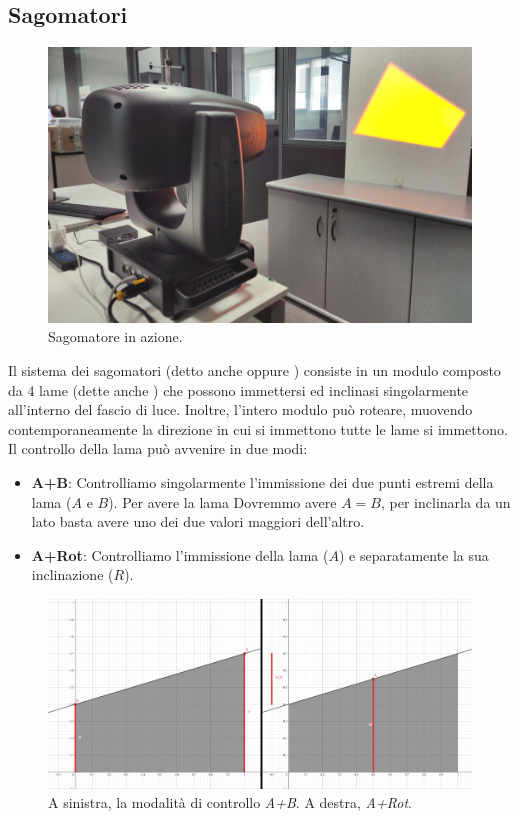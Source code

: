 \documentclass[main.tex]{subfiles}
\begin{document}
\subsection{Sagomatori}\label{subsec:5_shaper}
\begin{figure}[H]
    \centering
    \includegraphics[width=.8\linewidth]{img/newFeatures/shaper.jpg}
    \caption{Sagomatore in azione.}
    \label{fig:5_shaper}
\end{figure}
Il sistema dei sagomatori (detto anche  oppure ) consiste in un modulo composto da 4 lame (dette anche ) che possono immettersi ed inclinasi singolarmente all'interno del fascio di luce. Inoltre, l'intero modulo può roteare, muovendo contemporaneamente la direzione in cui si immettono tutte le lame si immettono. \newline
\clearpage %
Il controllo della lama può avvenire in due modi:
\begin{itemize}
	\item \textbf{A+B}: Controlliamo singolarmente l'immissione dei due punti estremi della lama ($A$ e $B$). Per avere la lama  Dovremmo avere $A = B$, per inclinarla da un lato basta avere uno dei due valori maggiori dell'altro.
	\item \textbf{A+Rot}: Controlliamo l'immissione della lama ($A$) e separatamente la sua inclinazione ($R$).
\end{itemize}
\begin{figure}[H]
    \centering
    \includegraphics[width=1\linewidth]{img/newFeatures/abVSarot.png}
    \caption{A sinistra, la modalità di controllo \textit{A+B}. A destra, \textit{A+Rot}.}
    \label{fig:5_shaperDifferentModes}
\end{figure}
\end{document}
